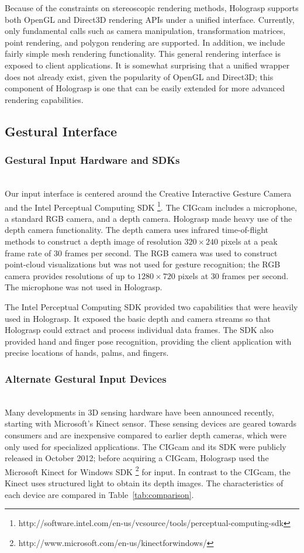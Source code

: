 \documentclass[pageno]{jpaper}
\begin{document}
Because of the constraints on stereoscopic rendering methods, Holograsp supports both OpenGL and Direct3D rendering APIs under a unified interface.
Currently, only fundamental calls such as camera manipulation, transformation matrices, point rendering, and polygon rendering are supported. In addition,
we include fairly simple mesh rendering functionality. This general rendering interface is exposed to client applications. It is somewhat surprising that
a unified wrapper does not already exist, given the popularity of OpenGL and Direct3D; this component of Holograsp is one that can be easily extended for
more advanced rendering capabilities.

\subsection{Gestural Interface}
\subsubsection{Gestural Input Hardware and SDKs} $ $\\
Our input interface is centered around the Creative Interactive Gesture Camera and the Intel Perceptual Computing SDK
\footnote{http://software.intel.com/en-us/vcsource/tools/perceptual-computing-sdk}.
The CIGcam includes a microphone, a standard RGB camera, and a depth camera. Holograsp made heavy use of the depth camera functionality.
The depth camera uses infrared time-of-flight methods to construct a depth image of resolution $320 \times 240$ pixels at a peak frame
rate of 30 frames per second. The RGB camera was used to construct point-cloud visualizations but was not used for gesture recognition;
the RGB camera provides resolutions of up to $1280 \times 720$ pixels at 30 frames per second. The microphone was not used in Holograsp.

The Intel Perceptual Computing SDK provided two capabilities that were heavily used in Holograsp. It exposed the basic depth and 
camera streams so that Holograsp could extract and process individual data frames. The SDK also provided
hand and finger pose recognition, providing the client application with precise locations of hands, palms, and fingers.

\subsubsection{Alternate Gestural Input Devices}$ $\\
Many developments in 3D sensing hardware have been announced recently, starting with Microsoft's Kinect sensor. These sensing
devices are geared towards consumers and are inexpensive compared to earlier depth cameras, which were only used for specialized applications.
The CIGcam and its SDK were publicly released in October 2012; before acquiring a CIGcam, Holograsp used the Microsoft Kinect for Windows SDK
\footnote{http://www.microsoft.com/en-us/kinectforwindows/} for input. In contrast to the CIGcam, the Kinect uses structured light
to obtain its depth images. The characteristics of each device are compared in Table~\ref{tab:comparison}.
\end{document}
